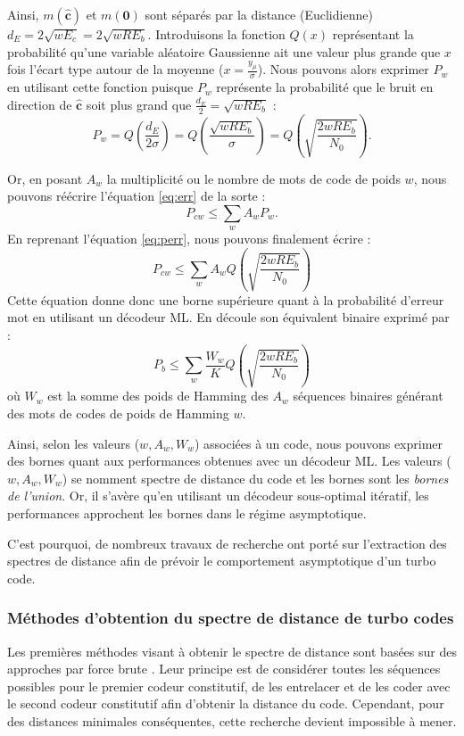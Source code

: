 Ainsi, $m(\mathbf{\hat{c}})$ et $m(\mathbf{0})$ sont séparés par la distance (Euclidienne) $d_E = 2\sqrt{wE_c} = 2\sqrt{wRE_b}$. Introduisons la fonction $Q(x)$ représentant la probabilité qu'une variable aléatoire Gaussienne ait une valeur plus grande que $x$ fois l'écart type autour de la moyenne ($x=\frac{y_\mu}{\sigma}$). Nous pouvons alors exprimer $P_w$ en utilisant cette fonction puisque $P_w$ représente la probabilité que le bruit en direction de $\mathbf{\hat{c}}$ soit plus grand que $\frac{d_E}{2} = \sqrt{wRE_b}$ : 
\begin{equation}\label{eq:perr}
	P_w = Q\left(\frac{d_E}{2\sigma}\right) = Q\left(\frac{\sqrt{wRE_b}}{\sigma}\right) = Q\left(\sqrt{\frac{2wRE_b}{N_0}}\right).  
\end{equation} 

Or, en posant $A_w$ la multiplicité ou le nombre de mots de code de poids $w$, nous pouvons réécrire l'équation \ref{eq:err} de la sorte : 
\[P_{cw} \le \sum\limits_w A_wP_w.\]
En reprenant l'équation \ref{eq:perr}, nous pouvons finalement écrire :
\begin{equation} \label{eq:uboundfer}
	P_{cw} \le \sum\limits_w A_w Q\left(\sqrt{\frac{2wRE_b}{N_0}}\right)
\end{equation}
Cette équation donne donc une borne supérieure quant à la probabilité d'erreur mot en utilisant un décodeur ML. En découle son équivalent binaire exprimé par :
\begin{equation} \label{eq:uboundfer}
	P_{b} \le \sum\limits_w \frac{W_w}{K} Q\left(\sqrt{\frac{2wRE_b}{N_0}}\right)
\end{equation} 
où $W_w$ est la somme des poids de Hamming des $A_w$ séquences binaires générant  des mots de codes de poids de Hamming $w$.
	
Ainsi, selon les valeurs ($w,A_w,W_w$) associées à un code, nous pouvons exprimer des bornes quant aux performances obtenues avec un décodeur ML. Les valeurs ($w,A_w,W_w$) se nomment spectre de distance du code et les bornes sont les \emph{bornes de l'union}. Or, il s'avère qu'en utilisant un décodeur sous-optimal itératif, les performances approchent les bornes dans le régime asymptotique.
	
C'est pourquoi, de nombreux travaux de recherche ont porté sur l'extraction des spectres de distance afin de prévoir le comportement asymptotique d'un turbo code.
	
\subsubsection{Méthodes d'obtention du spectre de distance de turbo codes}
Les premières méthodes visant à obtenir le spectre de distance sont basées sur des approches par force brute \cite{illuminating}. Leur principe est de considérer toutes les séquences possibles pour le premier codeur constitutif, de les entrelacer et de les coder avec le second codeur constitutif afin d'obtenir la distance du code. Cependant, pour des distances minimales conséquentes, cette recherche devient impossible à mener.
	

